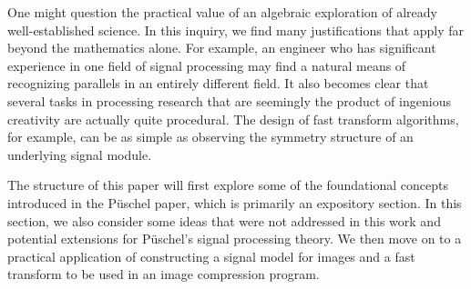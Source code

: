 \documentclass[12pt,technote]{IEEEtran}
\begin{document}
One might question the practical value of an algebraic exploration of already well-established science. In this inquiry, we find many justifications that apply far beyond the mathematics alone. For example, an engineer who has significant experience in one field of signal processing may find a natural means of recognizing parallels in an entirely different field. It also becomes clear that several tasks in processing research that are seemingly the product of ingenious creativity are actually quite procedural. The design of fast transform algorithms, for example, can be as simple as observing the symmetry structure of an underlying signal module.

The structure of this paper will first explore some of the foundational concepts introduced in the P\"uschel paper, which is primarily an expository section. In this section, we also consider some ideas that were not addressed in this work and potential extensions for P\"uschel's signal processing theory. We then move on to a practical application of constructing a signal model for images and a fast transform to be used in an image compression program.
\end{document}
